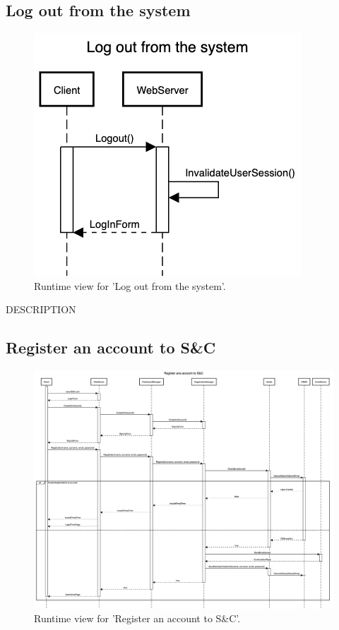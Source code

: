 \subsection{Log out from the system}
\begin{figure}[H]
    \begin{center}
        \includegraphics[width=0.8\linewidth]{DD/LaTeX/Images/RuntimeView/LogOut.png}
        \caption{Runtime view for 'Log out from the system'.}
        \label{fig:runtime_LogOu}%
    \end{center}
\end{figure}

DESCRIPTION


\subsection{Register an account to S\&C}
\begin{figure}[H]
    \begin{center}
        \includegraphics[width=0.8\linewidth]{DD/LaTeX/Images/RuntimeView/SignUp.png}
        \caption{Runtime view for 'Register an account to S\&C'.}
        \label{fig:runtime_SignUp}%
    \end{center}
\end{figure}

